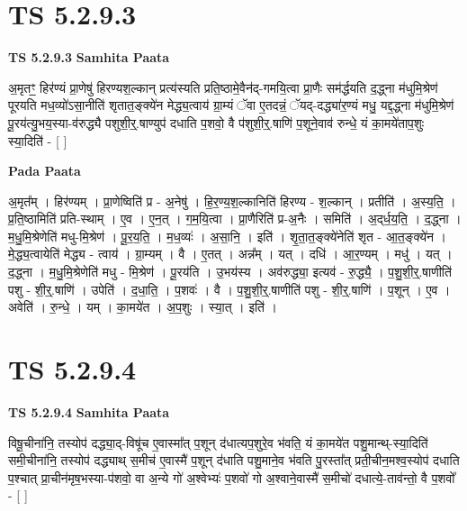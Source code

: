 \documentclass[17pt]{extarticle}
\begin{document}
\section*{ TS 5.2.9.3 }

\textbf{TS 5.2.9.3 } \newline
\textbf{Samhita Paata} \newline

अ॒मृतꣳ॒॒ हिर॑ण्यं प्रा॒णेषु॑ हिरण्यश॒ल्कान् प्रत्य॑स्यति प्रति॒ष्ठामे॒वैन॑द्-गमयि॒त्वा प्रा॒णैः सम॑र्द्धयति द॒द्ध्ना म॑धुमि॒श्रेण॑ पूरयति मध॒व्यो॑ऽसा॒नीति॑ शृतात॒ङ्क्ये॑न मेद्ध्य॒त्वाय॑ ग्रा॒म्यं ॅवा ए॒तदन्नं॒ ॅयद्-दद्ध्या॑र॒ण्यं मधु॒ यद्द॒द्ध्ना म॑धुमि॒श्रेण॑ पू॒रय॑त्यु॒भय॒स्या-व॑रुद्ध्यै पशुशी॒र्॒.षाण्युप॑ दधाति प॒शवो॒ वै प॑शुशी॒र्॒.षाणि॑ प॒शूने॒वाव॑ रुन्धे॒ यं का॒मये॑ताप॒शुः स्या॒दिति॑ - [  ] \newline

\textbf{Pada Paata} \newline

अ॒मृत᳚म् । हिर॑ण्यम् । प्रा॒णेष्विति॑ प्र - अ॒नेषु॑ । हि॒र॒ण्य॒श॒ल्कानिति॑ हिरण्य - श॒ल्कान् । प्रतीति॑ । अ॒स्य॒ति॒ । प्र॒ति॒ष्ठामिति॑ प्रति-स्थाम् । ए॒व । ए॒न॒त् । ग॒म॒यि॒त्वा । प्रा॒णैरिति॑ प्र-अ॒नैः । समिति॑ । अ॒द्‌र्ध॒य॒ति॒ । द॒द्ध्ना । म॒धु॒मि॒श्रेणेति॑ मधु-मि॒श्रेण॑ । पू॒र॒य॒ति॒ । म॒ध॒व्यः॑ । अ॒सा॒नि॒ । इति॑ । शृ॒ता॒त॒ङ्क्ये॑नेति॑ शृत - आ॒त॒ङ्क्ये॑न । मे॒द्ध्य॒त्वायेति॑ मेद्ध्य - त्वाय॑ । ग्रा॒म्यम् । वै । ए॒तत् । अन्न᳚म् । यत् । दधि॑ । आ॒र॒ण्यम् । मधु॑ । यत् । द॒द्ध्ना । म॒धु॒मि॒श्रेणेति॑ मधु - मि॒श्रेण॑ । पू॒रय॑ति । उ॒भय॑स्य । अव॑रुद्ध्या॒ इत्यव॑ - रु॒द्ध्यै॒ । प॒शु॒शी॒र्॒.षाणीति॑ पशु - शी॒र्॒.षाणि॑ । उपेति॑ । द॒धा॒ति॒ । प॒शवः॑ । वै । प॒शु॒शी॒र्॒.षाणीति॑ पशु - शी॒र्॒.षाणि॑ । प॒शून् । ए॒व । अवेति॑ । रु॒न्धे॒ । यम् । का॒मये॑त । अ॒प॒शुः । स्या॒त् । इति॑ ।  \newline




\section*{ TS 5.2.9.4 }

\textbf{TS 5.2.9.4 } \newline
\textbf{Samhita Paata} \newline

विषू॒चीना॑नि॒ तस्योप॑ दद्ध्या॒द्-विषू॑च ए॒वास्मा᳚त् प॒शून् द॑धात्यप॒शुरे॒व भ॑वति॒ यं का॒मये॑त पशु॒मान्थ्-स्या॒दिति॑ समी॒चीना॑नि॒ तस्योप॑ दद्ध्याथ् स॒मीच॑ ए॒वास्मै॑ प॒शून् द॑धाति पशु॒माने॒व भ॑वति पु॒रस्ता᳚त् प्रती॒चीन॒मश्व॒स्योप॑ दधाति प॒श्चात् प्रा॒चीन॑मृष॒भस्या-प॑शवो॒ वा अ॒न्ये गो॑ अ॒श्वेभ्यः॑ प॒शवो॑ गो अ॒श्वाने॒वास्मै॑ स॒मीचो॑ दधात्ये॒-ताव॑न्तो॒ वै प॒शवो᳚ - [  ] \newline
\end{document}
